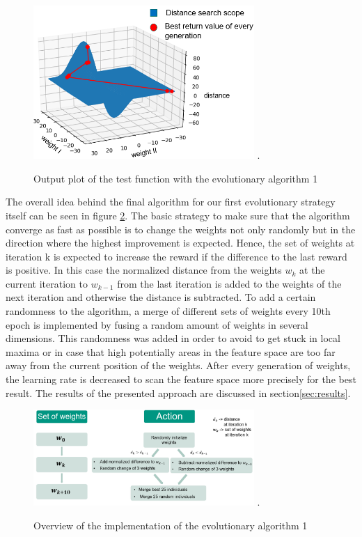 \begin{figure}[H]
	\centering
	\includegraphics[width=3.3in]{img/test_function.png}
	\DeclareGraphicsExtensions.
	\caption{Output plot of the test function with the evolutionary algorithm 1}
	\label{fig:test_function}
\end{figure}

The overall idea behind the final algorithm for our first evolutionary strategy itself can be seen in figure \ref{fig:evo_strat_1}. The basic strategy to make sure that the algorithm converge as fast as possible is to change the weights not only randomly but in the direction where the highest improvement is expected. Hence, the set of weights at iteration k is expected to increase the reward if the difference to the last reward is positive. In this case the normalized distance from the weights $w_k$  at the current iteration to $w_{k-1}$ from the last iteration is added to the weights of the next iteration and otherwise the distance is subtracted. To add a certain randomness to the algorithm, a merge of different sets of weights every 10th epoch is implemented by fusing a random amount of weights in several dimensions. This randomness was added in order to avoid to get stuck in local maxima or in case that high potentially areas in the feature space are too far away from the current position of the weights. After every generation of weights, the learning rate is decreased to scan the feature space more precisely for the best result. 
The results of the presented approach are discussed in section\ref{sec:results}.

\begin{figure}[H]
	\centering
	\includegraphics[width=3.3in]{img/evo_strat_1.png}
	\DeclareGraphicsExtensions.
	\caption{Overview of the implementation of the evolutionary algorithm 1}
	\label{fig:evo_strat_1}
\end{figure}

